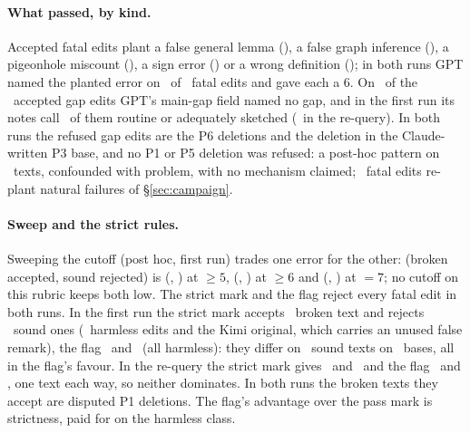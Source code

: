 \documentclass{article}
\begin{document}
\paragraph{What passed, by kind.} Accepted fatal edits plant a false general lemma (\CRMechLemma), a false graph inference (\CRMechGraph), a pigeonhole miscount (\CRMechPigeon), a sign error (\CRMechSign) or a wrong definition (\CRMechDef); in both runs GPT named the planted error on \CRGPTFatalNamedP\ of \CRNPerClass\ fatal edits and gave each a 6. On \CRGPTGapMainNoneP\ of the \CRPassGAccP\ accepted gap edits GPT's main-gap field named no gap, and in the first run its notes call \CRGPTGapRoutineP\ of them routine or adequately sketched (\CRGPTGapRoutineR\ in the re-query). In both runs the refused gap edits are the P6 deletions and the deletion in the Claude-written P3 base, and no P1 or P5 deletion was refused: a post-hoc pattern on \CRNPerClass\ texts, confounded with problem, with no mechanism claimed; \CRReplantF\ fatal edits re-plant natural failures of \S\ref{sec:campaign}.

\paragraph{Sweep and the strict rules.} Sweeping the cutoff (post hoc, first run) trades one error for the other: (broken accepted, sound rejected) is (\CRSweepFiveBrokenP, \CRSweepFiveSoundP) at $\ge 5$, (\CRSweepSixBrokenP, \CRSweepSixSoundP) at $\ge 6$ and (\CRSweepSevenBrokenP, \CRSweepSevenSoundP) at $=7$; no cutoff on this rubric keeps both low. The strict mark and the flag reject every fatal edit in both runs. In the first run the strict mark accepts \CRStrictBrokenAccP\ broken text and rejects \CRStrictSoundRejP\ sound ones (\CRStrictSoundRejHP\ harmless edits and the Kimi original, which carries an unused false remark), the flag \CRFlagBrokenAccP\ and \CRFlagSoundRejP\ (all harmless): they differ on \CRStrictFlagDiscordSoundP\ sound texts on \CRStrictFlagDiscordBasesP\ bases, all in the flag's favour. In the re-query the strict mark gives \CRStrictBrokenAccR\ and \CRStrictSoundRejR\ and the flag \CRFlagBrokenAccR\ and \CRFlagSoundRejR, one text each way, so neither dominates. In both runs the broken texts they accept are disputed P1 deletions. The flag's advantage over the pass mark is strictness, paid for on the harmless class.
\end{document}
